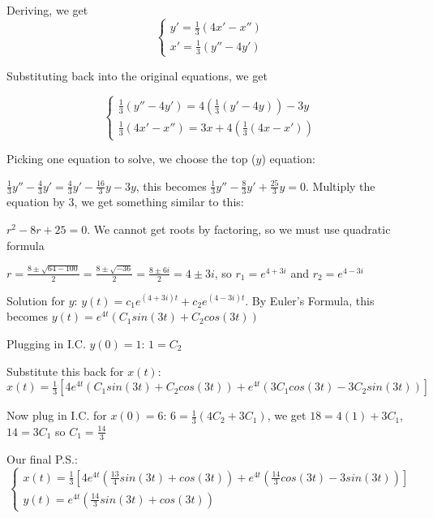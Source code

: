 \documentclass{article}
\begin{document}
\noindent Deriving, we get $$
\begin{cases}
y' = \frac{1}{3}(4x' - x'')\\
x' = \frac{1}{3}(y'' - 4y')
\end{cases}
$$ \par

\noindent Substituting back into the original equations, we get \par
$$
\begin{cases}
\frac{1}{3}(y'' - 4y') = 4(\frac{1}{3}(y' - 4y)) - 3y\\
\frac{1}{3}(4x' - x'') = 3x + 4(\frac{1}{3}(4x - x'))
\end{cases}
$$ \par

\noindent Picking one equation to solve, we choose the top ($y$) equation: \par
\noindent $\frac{1}{3}y'' - \frac{4}{3}y' = \frac{4}{3}y' - \frac{16}{3}y - 3y$, this becomes $\frac{1}{3}y'' - \frac{8}{3}y' + \frac{25}{3}y = 0$.  Multiply the equation by 3, we get something similar to this: \par
\noindent $r^{2} - 8r + 25 = 0$.  We cannot get roots by factoring, so we must use quadratic formula \par\vspace{0.25cm}

\noindent $r = \frac{8 \pm \sqrt{64 - 100}}{2} = \frac{8 \pm \sqrt{-36}}{2} = \frac{8 \pm 6i}{2} = 4 \pm 3i$, so $r_{1} = e^{4 + 3i}$ and $r_{2} = e^{4 - 3i}$ \par
\noindent Solution for $y$: $y(t) = c_{1}e^{(4 + 3i)t} + c_{2}e^{(4 - 3i)t}$.  By Euler's Formula, this becomes $y(t) = e^{4t}(C_{1}sin(3t) + C_{2}cos(3t))$ \par
\noindent Plugging in I.C. $y(0) = 1$: $1 = C_{2}$
\par\vspace{0.25cm}

\noindent Substitute this back for $x(t)$: $x(t) = \frac{1}{3}[4e^{4t}(C_{1}sin(3t) + C_{2}cos(3t)) + e^{4t}(3C_{1}cos(3t) - 3C_{2}sin(3t))]$ \par
\noindent Now plug in I.C. for $x(0) = 6$: $6 = \frac{1}{3}(4C_{2} + 3C_{1})$, we get $18 = 4(1) + 3C_{1}$, $14 = 3C_{1}$ so $C_{1} = \frac{14}{3}$ \par\vspace{0.25cm}
\noindent Our final P.S.:
$$
\begin{cases}
x(t) = \frac{1}{3}[4e^{4t}(\frac{13}{4}sin(3t) + cos(3t)) + e^{4t}(\frac{14}{3}cos(3t) - 3sin(3t))]\\
y(t) = e^{4t}(\frac{14}{3}sin(3t) + cos(3t))
\end{cases}
$$ \par
\end{document}
